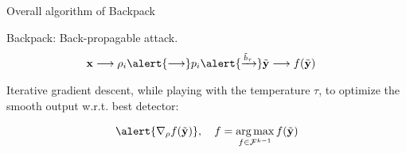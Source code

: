 \documentclass[10pt]{beamer}
\DeclareMathOperator*{\argmax}{arg\,max}
\begin{document}

    
    


\begin{frame}{Overall algorithm of Backpack}


\alert{Backpack}: \alert{Back-p}ropagable att\alert{ack}.
   \begin{align*}
    \mathbf{x} \longrightarrow \rho_i \alert{\longrightarrow} p_i \alert{ \xrightarrow{\tilde{b}_\tau}} \tilde{\mathbf{y}} & \longrightarrow f(\tilde{\mathbf{y}}) %
    \end{align*}
\pause

Iterative gradient descent, while playing with the temperature $\tau$, to optimize the smooth output w.r.t. best detector:

\begin{equation}
    \alert{\nabla_{\rho} f(\tilde{\mathbf{y}})}, \quad  f = \argmax_{f \in \mathcal{F}^{k-1}} f(\tilde{\mathbf{y}})
\end{equation}

\end{frame}
\end{document}
